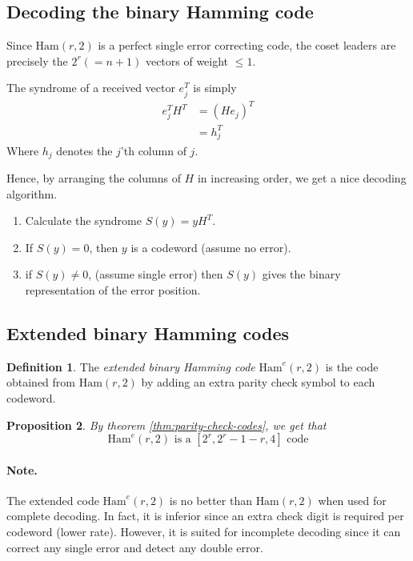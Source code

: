\documentclass[11pt,a4paper]{article}
\theoremstyle{definition}
\newtheorem{definition}{Definition}[section]
\theoremstyle{plain}
\newtheorem{proposition}[definition]{Proposition}
\theoremstyle{remark}
\begin{document}
\subsection{Decoding the binary Hamming code} 

Since $\text{Ham}(r, 2)$ is a perfect single error correcting code, the coset leaders 
are precisely the $2^r (= n + 1)$ vectors of weight $\leq 1$. 

The syndrome of a received vector $e_j^T$ is simply 
\begin{align*}
    e_j^T H^T &= (H e_j)^T \\
    &= h_j^T 
\end{align*}
Where $h_j$ denotes the $j$'th column of $j$. 

Hence, by arranging the columns of $H$ in increasing order, we get a nice decoding algorithm. 
\begin{enumerate}
    \item Calculate the syndrome $S(y) = y H^T$.
    \item If $S(y) = 0$, then $y$ is a codeword (assume no error). 
    \item if $S(y) \neq 0$, (assume single error) then $S(y)$ gives the binary 
    representation of the error position. 
\end{enumerate}

\subsection{Extended binary Hamming codes} 

\begin{definition}
    The \emph{extended binary Hamming code} $\text{Ham}^e(r, 2)$ is the code obtained from $\text{Ham}(r, 2)$ 
    by adding an extra parity check symbol to each codeword. 
\end{definition}

\begin{proposition}
    By theorem \ref{thm:parity-check-codes}, we get that 
    $$\text{Ham}^e(r,2) \text{ is a } [2^r, 2^r-1-r, 4] \text{ code}$$ 
\end{proposition}

\paragraph{Note.} The extended code $\text{Ham}^e(r,2)$ is no better than $\text{Ham}(r,2)$ when used for complete decoding. 
In fact, it is inferior since an extra check digit is required per codeword (lower rate). However, it is suited for incomplete decoding since 
it can correct any single error and detect any double error. 
\end{document}
